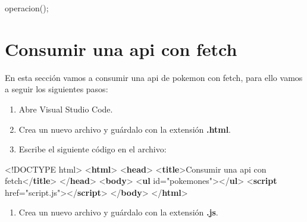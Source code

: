 \documentclass[
  a4paper,
  DIV=11,
  numbers=noendperiod,
  onepage,
  openany]{scrreprt}
\newenvironment{Shaded}{\begin{snugshade}}{\end{snugshade}}
\newcommand{\DataTypeTok}[1]{\textcolor[rgb]{0.68,0.00,0.00}{#1}}
\newcommand{\FunctionTok}[1]{\textcolor[rgb]{0.28,0.35,0.67}{#1}}
\newcommand{\KeywordTok}[1]{\textcolor[rgb]{0.00,0.23,0.31}{\textbf{#1}}}
\newcommand{\NormalTok}[1]{\textcolor[rgb]{0.00,0.23,0.31}{#1}}
\newcommand{\OperatorTok}[1]{\textcolor[rgb]{0.37,0.37,0.37}{#1}}
\newcommand{\OtherTok}[1]{\textcolor[rgb]{0.00,0.23,0.31}{#1}}
\newcommand{\StringTok}[1]{\textcolor[rgb]{0.13,0.47,0.30}{#1}}
\providecommand{\tightlist}{%
  \setlength{\itemsep}{0pt}\setlength{\parskip}{0pt}}\usepackage{longtable,booktabs,array}
\begin{document}
\begin{tcolorbox}
\begin{Shaded}
\begin{Highlighting}[]
\FunctionTok{operacion}\NormalTok{()}\OperatorTok{;}
\end{Highlighting}
\end{Shaded}

\section{Consumir una api con fetch}\label{consumir-una-api-con-fetch}

En esta sección vamos a consumir una api de pokemon con fetch, para ello
vamos a seguir los siguientes pasos:

\begin{enumerate}
\def\labelenumi{\arabic{enumi}.}
\item
  Abre Visual Studio Code.
\item
  Crea un nuevo archivo y guárdalo con la extensión \textbf{.html}.
\item
  Escribe el siguiente código en el archivo:
\end{enumerate}

\begin{Shaded}
\begin{Highlighting}[]
\DataTypeTok{\textless{}!DOCTYPE}\NormalTok{ html}\DataTypeTok{\textgreater{}}
\DataTypeTok{\textless{}}\KeywordTok{html}\DataTypeTok{\textgreater{}}
\DataTypeTok{\textless{}}\KeywordTok{head}\DataTypeTok{\textgreater{}}
    \DataTypeTok{\textless{}}\KeywordTok{title}\DataTypeTok{\textgreater{}}\NormalTok{Consumir una api con fetch}\DataTypeTok{\textless{}/}\KeywordTok{title}\DataTypeTok{\textgreater{}}
\DataTypeTok{\textless{}/}\KeywordTok{head}\DataTypeTok{\textgreater{}}
\DataTypeTok{\textless{}}\KeywordTok{body}\DataTypeTok{\textgreater{}}
    \DataTypeTok{\textless{}}\KeywordTok{ul}\OtherTok{ id}\OperatorTok{=}\StringTok{"pokemones"}\DataTypeTok{\textgreater{}\textless{}/}\KeywordTok{ul}\DataTypeTok{\textgreater{}}
    \DataTypeTok{\textless{}}\KeywordTok{script}\OtherTok{ href}\OperatorTok{=}\StringTok{"script.js"}\DataTypeTok{\textgreater{}\textless{}/}\KeywordTok{script}\DataTypeTok{\textgreater{}}
\DataTypeTok{\textless{}/}\KeywordTok{body}\DataTypeTok{\textgreater{}}
\DataTypeTok{\textless{}/}\KeywordTok{html}\DataTypeTok{\textgreater{}}
\end{Highlighting}
\end{Shaded}

\begin{enumerate}
\def\labelenumi{\arabic{enumi}.}
\setcounter{enumi}{3}
\tightlist
\item
  Crea un nuevo archivo y guárdalo con la extensión \textbf{.js}.
\end{enumerate}


\end{tcolorbox}
\end{document}
